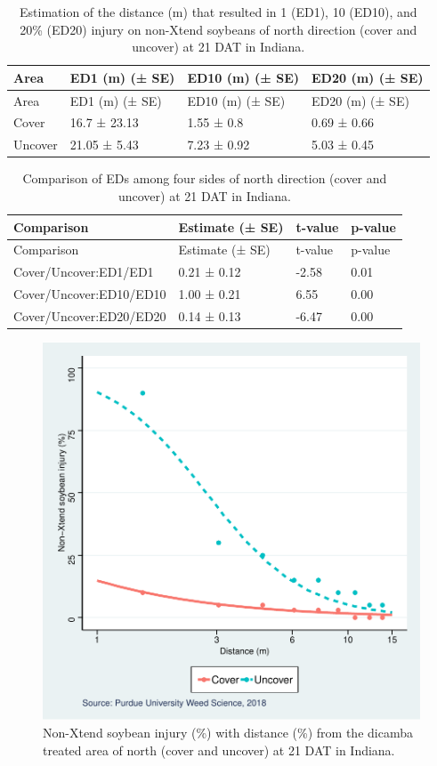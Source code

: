 \documentclass[]{article}
\begin{document}
\begin{longtable}[]{@{}llll@{}}
\caption{Estimation of the distance (m) that resulted in 1 (ED1), 10
(ED10), and 20\% (ED20) injury on non-Xtend soybeans of north direction
(cover and uncover) at 21 DAT in Indiana.}\tabularnewline
\toprule
Area & ED1 (m) (± SE) & ED10 (m) (± SE) & ED20 (m) (± SE)\tabularnewline
\midrule
\endfirsthead
\toprule
Area & ED1 (m) (± SE) & ED10 (m) (± SE) & ED20 (m) (± SE)\tabularnewline
\midrule
\endhead
Cover & 16.7 ± 23.13 & 1.55 ± 0.8 & 0.69 ± 0.66\tabularnewline
Uncover & 21.05 ± 5.43 & 7.23 ± 0.92 & 5.03 ± 0.45\tabularnewline
\bottomrule
\end{longtable}

\begin{longtable}[]{@{}llll@{}}
\caption{Comparison of EDs among four sides of north direction (cover
and uncover) at 21 DAT in Indiana.}\tabularnewline
\toprule
Comparison & Estimate (± SE) & t-value & p-value\tabularnewline
\midrule
\endfirsthead
\toprule
Comparison & Estimate (± SE) & t-value & p-value\tabularnewline
\midrule
\endhead
Cover/Uncover:ED1/ED1 & 0.21 ± 0.12 & -2.58 & 0.01\tabularnewline
Cover/Uncover:ED10/ED10 & 1.00 ± 0.21 & 6.55 & 0.00\tabularnewline
Cover/Uncover:ED20/ED20 & 0.14 ± 0.13 & -6.47 & 0.00\tabularnewline
\bottomrule
\end{longtable}

\begin{figure}
\centering
\includegraphics{Report_Dicamba_study_files/figure-latex/unnamed-chunk-27-1.pdf}
\caption{Non-Xtend soybean injury (\%) with distance (\%) from the
dicamba treated area of north (cover and uncover) at 21 DAT in Indiana.}
\end{figure}
\end{document}
